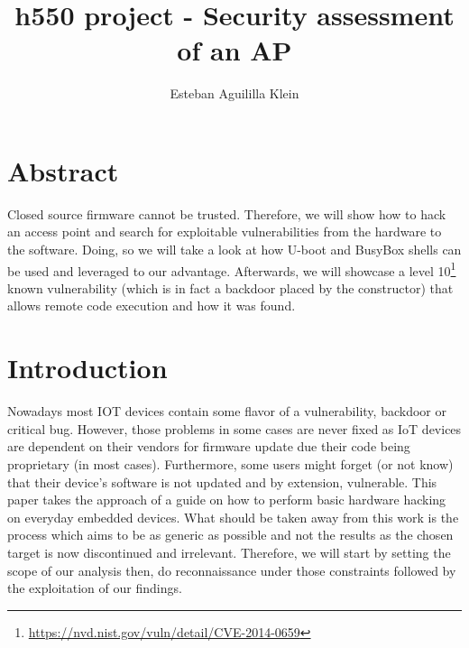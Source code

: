 \documentclass{article}
\title{h550 project - Security assessment of an AP}
\author{Esteban Aguililla Klein}
\begin{document}
\maketitle	
\tableofcontents
\newpage
\section{Abstract}
Closed source firmware cannot be trusted. Therefore, we will show how to hack an access point and search for exploitable vulnerabilities from the hardware to the software. Doing, so we will take a look at how U-boot and BusyBox shells can be used and leveraged to our advantage. Afterwards, we will showcase a level 10\footnote{\url{https://nvd.nist.gov/vuln/detail/CVE-2014-0659}} known vulnerability (which is in fact a backdoor placed by the constructor) that allows remote code execution and how it was found. 
\section{Introduction}
Nowadays most IOT devices contain some flavor of a vulnerability, backdoor or critical bug. However, those problems in some cases are never fixed as IoT devices are dependent on their vendors for firmware update due their code being proprietary (in most cases). Furthermore, some users might forget (or not know) that their device's software is not updated and by extension, vulnerable. This paper takes the approach of a guide on how to perform basic hardware hacking on everyday embedded devices. What should be taken away from this work is the process which aims to be as generic as possible and not the results as the chosen target is now discontinued and irrelevant. Therefore, we will start by setting the scope of our analysis then, do reconnaissance under those constraints followed by the exploitation of our findings.
\end{document}
